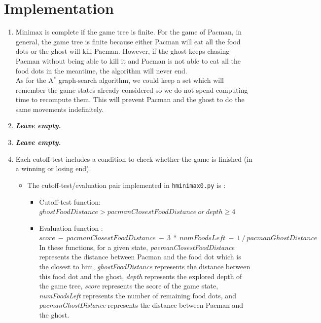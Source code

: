 \documentclass{article}
\begin{document}
\section{Implementation}

\begin{enumerate}[label=\alph*.,leftmargin=*]
    \item Minimax is complete if the game tree is finite. For the game of Pacman, in general, the game tree is finite because either Pacman will eat all the food dots or the ghost will kill Pacman. However, if the ghost keeps chasing Pacman without being able to kill it and Pacman is not able to eat all the food dots in the meantime, the algorithm will never end.\\
    As for the A$^*$ graph-search algorithm, we could keep a set which will remember the game states already considered so we do not spend computing time to recompute them. This will prevent Pacman and the ghost to do the same movements indefinitely.
    \item \textbf{\textit{Leave empty.}}
    \item \textbf{\textit{Leave empty.}}
	\item Each cutoff-test includes a condition to check whether the game is finished (in a winning or losing end).
		\begin{itemize}
			\item The cutoff-test/evaluation pair implemented in \texttt{hminimax0.py} is :
				\begin{itemize}
					\item Cutoff-test function: $ghostFoodDistance > pacmanClosestFoodDistance \ or \ depth \geq 4$
					\item Evaluation function : $score \ - \ pacmanClosestFoodDistance \ - \ 3 \ * \ numFoodsLeft \ - \ 1 \ / \ pacmanGhostDistance$\\
					
					In these functions, for a given state, \textit{pacmanClosestFoodDistance} represents the distance between Pacman and the food dot which is the closest to him, \textit{ghostFoodDistance} represents the distance between this food dot and the ghost, \textit{depth} represents the explored depth of the game tree, \textit{score} represents the score of the game state, \textit{numFoodsLeft} represents the number of remaining food dots, and \textit{pacmanGhostDistance} represents the distance between Pacman and the ghost.\\
					

\end{itemize}
\end{itemize}
\end{enumerate}
\end{document}

